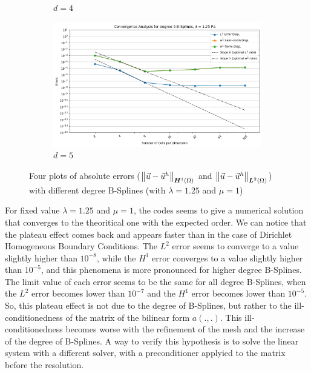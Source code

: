 \documentclass[a4paper,12pt,twoside]{report}
\begin{document}
\begin{figure}[!h]
\begin{subfigure}[b]{0.49\textwidth}
		\caption{$d=4$}
		\label{fig:deg4_NM}
	\end{subfigure}
	\begin{subfigure}[b]{0.49\textwidth}
		\centering
		\includegraphics[width=\textwidth]{figures/figures_non_mixed/convergence_plot_degree_5_lambda=1.25.png}
		\caption{$d=5$}
		\label{fig:deg5_NM}
	\end{subfigure}
	\caption{Four plots of absolute errors ($\norm{\vec u - \vec u^h}_{\boldsymbol H^1(\Omega)}$ and $\norm{\vec u - \vec u^h}_{\boldsymbol L^2(\Omega)}$) with different degree B-Splines (with $\lambda = 1.25$ and $\mu = 1$)}
	\label{fig:four_errors_graphs}
\end{figure}

For fixed value $\lambda = 1.25$ and $\mu = 1$, the codes seems to give a numerical solution that converges to the theoritical one with the expected order. We can notice that the plateau effect comes back and appears faster than in the case of Dirichlet Homogeneous Boundary Conditions. The $L^2$ error seems to converge to a value slightly higher than $10^{-8}$, while the $H^1$ error converges to a value slightly higher than $10^{-5}$, and this phenomena is more pronounced for higher degree B-Splines. The limit value of each error seems to be the same for all degree B-Splines, when the $L^2$ error becomes lower than $10^{-7}$ and the $H^1$ error becomes lower than $10^{-5}$. So, this plateau effect is not due to the degree of B-Splines, but rather to the ill-conditionedness of the matrix of the bilinear form $a(.,.)$. This ill-conditionedness becomes worse with the refinement of the mesh and the increase of the degree of B-Splines. A way to verify this hypothesis is to solve the linear system with a different solver, with a preconditioner applyied to the matrix before the resolution.
\end{document}
